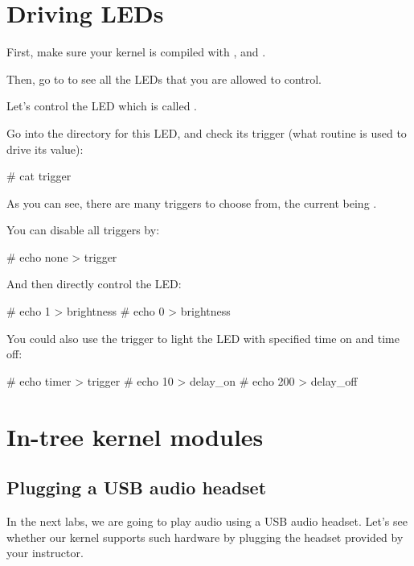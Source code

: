 \section{Driving LEDs}

First, make sure your kernel is compiled with
, 
and .

Then, go to  to see all the LEDs that you are allowed
to control.

Let's control the LED which is called
.

Go into the directory for this LED, and check its trigger (what
routine is used to drive its value):

\begin{bashinput}
# cat trigger
\end{bashinput}

As you can see, there are many triggers to choose from, the current
being .

You can disable all triggers by:

\begin{bashinput}
# echo none > trigger
\end{bashinput}

And then directly control the LED:

\begin{bashinput}
# echo 1 > brightness
# echo 0 > brightness
\end{bashinput}

You could also use the  trigger to light the LED
with specified time on and time off:

\begin{bashinput}
# echo timer > trigger
# echo 10 > delay_on
# echo 200 > delay_off
\end{bashinput}

\section{In-tree kernel modules}
\subsection{Plugging a USB audio headset}

In the next labs, we are going to play audio using a USB audio headset.
Let's see whether our kernel supports such hardware by plugging the
headset provided by your instructor.

